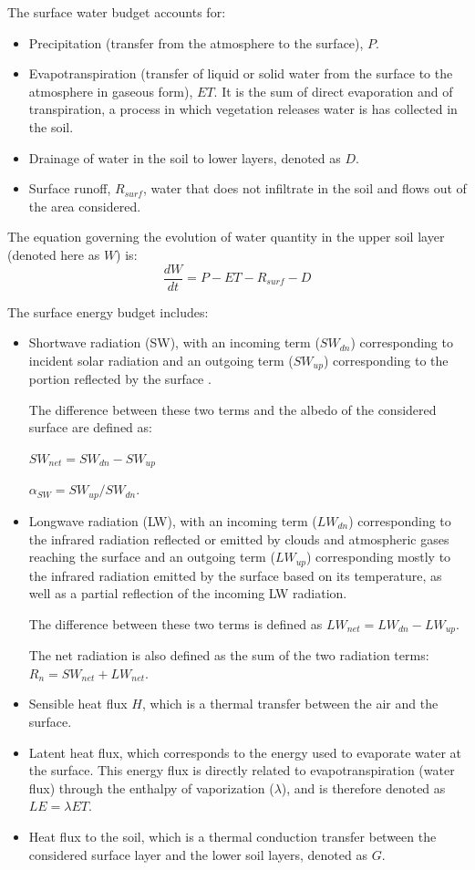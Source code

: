 The surface water budget accounts for:
\begin{itemize}
    \item Precipitation (transfer from the atmosphere to the surface), $P$.
    \item Evapotranspiration (transfer of liquid or solid water from the surface to the atmosphere in gaseous form), $ET$. It is the sum of direct evaporation and of transpiration, a process in  which vegetation releases water is has collected in the soil.
    \item Drainage of water in the soil to lower layers, denoted  as $D$. 
    \item Surface runoff, $R_{surf}$, water that does not infiltrate in the soil and flows out of the area considered.
\end{itemize}

The equation governing the evolution of water quantity in the upper soil layer (denoted here as $W$) is:
\begin{equation}
    \frac{dW}{dt} = P - ET - R_{surf} - D
\end{equation}

The surface energy budget includes:
\begin{itemize}
    \item Shortwave radiation (SW), with an incoming term ($SW_{dn}$) corresponding to incident solar radiation and an outgoing term ($SW_{up}$) corresponding to the portion reflected by the surface .

    The difference between these two terms and the albedo of the considered surface are defined as:

    $SW_{net} = SW_{dn} - SW_{up}$

    $\alpha_{SW} = SW_{up}/SW_{dn}$.
    \item Longwave radiation (LW), with an incoming term ($LW_{dn}$) corresponding to the infrared radiation reflected or emitted by clouds and atmospheric gases reaching the surface and an outgoing term ($LW_{up}$) corresponding mostly to the infrared radiation emitted by the surface based on its temperature, as well as a partial reflection of the incoming LW radiation.

    The difference between these two terms is defined as $LW_{net} = LW_{dn} - LW_{up}$.
    
    The net radiation is also defined as the sum of the two radiation terms: $R_{n} = SW_{net} + LW_{net}$.
    \item Sensible heat flux $H$, which is a thermal transfer between the air and the surface.
    \item Latent heat flux, which corresponds to the energy used to evaporate water at the surface. This energy flux is directly related to evapotranspiration (water flux) through the enthalpy of vaporization ($\lambda$), and is therefore denoted as $LE = \lambda ET$.
    \item Heat flux to the soil, which is a thermal conduction transfer between the considered surface layer and the lower soil layers, denoted as $G$.
\end{itemize}

